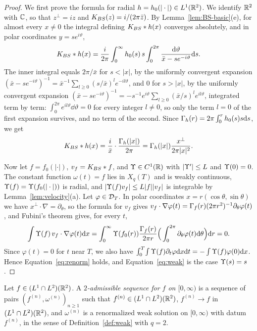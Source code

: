 \begin{proof}
We first prove the formula for radial $h=h_0(|\cdot|)\in L^1(\mathbb{R}^2)$. We
identify $\mathbb{R}^2$ with $\mathbb{C}$, so that $z^\perp=iz$ and $K_{BS}(z)=i/(2\pi\bar z)$.
By Lemma~\ref{lem:BS-basic}(e), for almost every $x\ne0$ the integral defining
$K_{BS}\ast h(x)$ converges absolutely, and in polar coordinates
$y=se^{i\vartheta}$,
\[
K_{BS}\ast h(x)=\frac{i}{2\pi}\int_0^\infty h_0(s)\,s
\int_0^{2\pi}\frac{\dd\vartheta}{\bar x-se^{-i\vartheta}}\dd s .
\]
The inner integral equals $2\pi/\bar x$ for $s<|x|$, by the uniformly
convergent expansion
$(\bar x-se^{-i\vartheta})^{-1}=\bar x^{-1}\sum_{l\ge0}(s/\bar x)^le^{-il\vartheta}$,
and $0$ for $s>|x|$, by the uniformly convergent expansion
$(\bar x-se^{-i\vartheta})^{-1}=-s^{-1}e^{i\vartheta}\sum_{l\ge0}(\bar x/s)^le^{il\vartheta}$,
integrated term by term: $\int_0^{2\pi}e^{il\vartheta}\dd\vartheta=0$ for every
integer $l\ne0$, so only the term $l=0$ of the first expansion survives, and no
term of the second.
Since $\Gamma_h(r)=2\pi\int_0^rh_0(s)s\dd s$, we get
\[
K_{BS}\ast h(x)=\frac{i}{\bar x}\cdot\frac{\Gamma_h(|x|)}{2\pi}
=\Gamma_h(|x|)\frac{x^\perp}{2\pi|x|^2} .
\]

Now let $f=f_0(|\cdot|)$, $v_f=K_{BS}\ast f$, and $\Upsilon\in C^1(\mathbb{R})$ with
$|\Upsilon'|\le L$ and $\Upsilon(0)=0$. The constant function $\omega(t)=f$ lies in
$X_q(T)$ and is weakly continuous, $\Upsilon(f)=\Upsilon(f_0(|\cdot|))$ is radial,
and $|\Upsilon(f)v_f|\le L|f||v_f|$ is
integrable by Lemma~\ref{lem:velocity}(a). Let $\varphi\in\mathcal{D}_T$. In polar
coordinates $x=r(\cos\theta,\sin\theta)$ we have
$x^\perp\cdot\nabla=\partial_\theta$, so the formula for $v_f$ gives
$v_f\cdot\nabla\varphi(t)=\Gamma_f(r)(2\pi r^2)^{-1}\partial_\theta\varphi(t)$,
and Fubini's theorem gives, for every $t$,
\[
\int\Upsilon(f)\,v_f\cdot\nabla\varphi(t)\dd x
=\int_0^\infty\Upsilon(f_0(r))\frac{\Gamma_f(r)}{2\pi r}
\Big(\int_0^{2\pi}\partial_\theta\varphi(t)\dd\theta\Big)\dd r=0 .
\]
Since $\varphi(t)=0$ for $t$ near $T$, we also have
$\int_0^T\!\int\Upsilon(f)\partial_t\varphi\dd x\dd t=-\int\Upsilon(f)\varphi(0)\dd x$. Hence
Equation~\eqref{eq:renorm} holds, and Equation~\eqref{eq:weak} is the case
$\Upsilon(s)=s$.
\end{proof}

\begin{definition}
\label{def:adm}
Let $f\in (L^1\cap L^2)(\mathbb{R}^2)$. A
\textit{$2$-admissible sequence for $f$ on $[0,\infty)$} is a sequence of pairs
$(f^{(n)},\omega^{(n)})_{n\ge1}$ such that $f^{(n)}\in (L^1\cap L^2)(\mathbb{R}^2)$,
$f^{(n)}\to f$ in $(L^1\cap L^2)(\mathbb{R}^2)$, and $\omega^{(n)}$ is a renormalized weak
solution on $[0,\infty)$ with datum $f^{(n)}$, in the sense of
Definition~\ref{def:weak} with $q=2$.
\end{definition}

